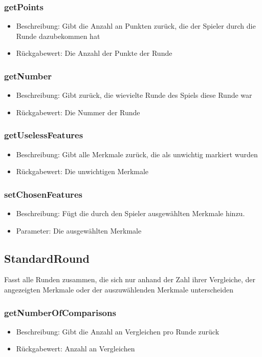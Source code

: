 \documentclass[a4paper]{scrreprt}
\begin{document}
   \subsubsection{getPoints}
      \begin{itemize}
          \item Beschreibung: Gibt die Anzahl an Punkten zurück, die der Spieler durch die Runde dazubekommen hat
          \item Rückgabewert: Die Anzahl der Punkte der Runde
      \end{itemize}
   \subsubsection{getNumber}
      \begin{itemize}
          \item Beschreibung: Gibt zurück, die wievielte Runde des Spiels diese Runde war
          \item Rückgabewert: Die Nummer der Runde
      \end{itemize}
   \subsubsection{getUselessFeatures}
      \begin{itemize}
          \item Beschreibung: Gibt alle Merkmale zurück, die als unwichtig markiert wurden
          \item Rückgabewert: Die unwichtigen Merkmale
      \end{itemize}
   \subsubsection{setChosenFeatures}
      \begin{itemize}
      \item Beschreibung: Fügt die durch den Spieler ausgewählten Merkmale hinzu.
      \item Parameter: Die ausgewählten Merkmale
      \end{itemize}
      
   \subsection{StandardRound}
   Fasst alle Runden zusammen, die sich nur anhand der Zahl ihrer Vergleiche, der angezeigten Merkmale oder der auszuwählenden Merkmale unterscheiden
   \subsubsection{getNumberOfComparisons}
   \begin{itemize}
   \item Beschreibung: Gibt die Anzahl an Vergleichen pro Runde zurück
   \item Rückgabewert: Anzahl an Vergleichen
   \end{itemize}
\end{document}
